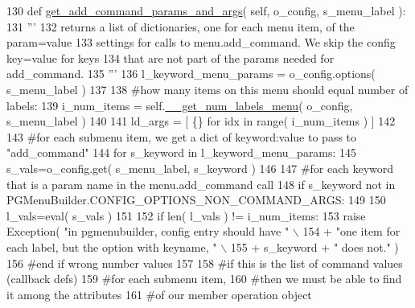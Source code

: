 \begin{DoxyCode}
130     \textcolor{keyword}{def }\hyperlink{classnegui_1_1pgmenubuilder_1_1PGMenuBuilder_a564a7629d3ba8ac1666a6f8a046d82f2}{get\_add\_command\_params\_and\_args}( self,  o\_config, s\_menu\_label ):
131         \textcolor{stringliteral}{'''}
132 \textcolor{stringliteral}{        returns a list of dictionaries, one for each menu item, of the param=value}
133 \textcolor{stringliteral}{        settings for calls to menu.add\_command.  We skip the config key=value for keys}
134 \textcolor{stringliteral}{        that are not part of the params needed for add\_command. }
135 \textcolor{stringliteral}{        '''}
136         l\_keyword\_menu\_params = o\_config.options( s\_menu\_label )    
137 
138         \textcolor{comment}{#how many items on this menu should equal number of labels:}
139         i\_num\_items = self.\hyperlink{classnegui_1_1pgmenubuilder_1_1PGMenuBuilder_a70776ac09761aeef9ee6df67c1dd9140}{\_\_get\_num\_labels\_menu}( o\_config, s\_menu\_label )
140 
141         ld\_args = [ \{\} \textcolor{keywordflow}{for} idx \textcolor{keywordflow}{in} range( i\_num\_items ) ]
142 
143         \textcolor{comment}{#for each submenu item, we get a dict of keyword:value to pass to "add\_command"}
144         \textcolor{keywordflow}{for} s\_keyword \textcolor{keywordflow}{in} l\_keyword\_menu\_params:
145             s\_vals=o\_config.get( s\_menu\_label, s\_keyword )
146 
147             \textcolor{comment}{#for each keyword that is a param name in the menu.add\_command call}
148             \textcolor{keywordflow}{if} s\_keyword \textcolor{keywordflow}{not} \textcolor{keywordflow}{in} PGMenuBuilder.CONFIG\_OPTIONS\_NON\_COMMAND\_ARGS:
149 
150                 l\_vals=eval( s\_vals )
151 
152                 \textcolor{keywordflow}{if} len( l\_vals ) != i\_num\_items:
153                     \textcolor{keywordflow}{raise} Exception( \textcolor{stringliteral}{"in pgmenubuilder, config entry should have "} \(\backslash\)
154                             + \textcolor{stringliteral}{"one item for each label, but the option with keyname, "} \(\backslash\)
155                             + s\_keyword + \textcolor{stringliteral}{" does not."} )
156                 \textcolor{comment}{#end if wrong number values}
157                 
158                 \textcolor{comment}{#if this is the list of command values (callback defs) }
159                 \textcolor{comment}{#for each submenu item,}
160                 \textcolor{comment}{#then we must be able to find it among the attributes}
161                 \textcolor{comment}{#of our member operation object}

\end{DoxyCode}

